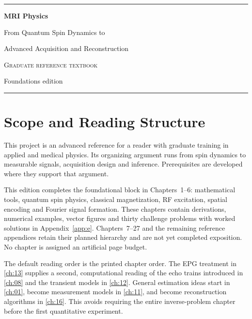 \documentclass[a4paper,10pt,twoside,openany]{book}
\begin{document}
\frontmatter
\begin{titlepage}
\thispagestyle{empty}
\vspace*{27mm}
{\noindent\color{MRIaccent}\rule{\textwidth}{1.1pt}\par}
\vspace{12mm}
{\fontsize{38}{43}\selectfont\bfseries MRI Physics\par}
\vspace{9mm}
{\Large From Quantum Spin Dynamics to\par
Advanced Acquisition and Reconstruction\par}
\vfill
{\small\scshape Graduate reference textbook\par}
\vspace{3mm}
{\small Foundations edition\par}
\vspace{10mm}
{\noindent\color{MRIaccent}\rule{\textwidth}{.4pt}\par}
\end{titlepage}
\chapter{Scope and Reading Structure}
\label{front:scope}
This project is an advanced reference for a reader with graduate training
in applied and medical physics. Its organizing argument runs from spin
dynamics to measurable signals, acquisition design and inference.
Prerequisites are developed where they support that argument.

This edition completes the foundational block in Chapters~1--6:
mathematical tools, quantum spin physics, classical magnetization,
RF excitation, spatial encoding and Fourier signal formation.
These chapters contain derivations, numerical examples, vector figures
and thirty challenge problems with worked solutions in Appendix~\ref{app:e}.
Chapters~7--27 and the remaining reference appendices retain their planned
hierarchy and are not yet completed exposition. No chapter is assigned
an artificial page budget.

The default reading order is the printed chapter order. The EPG treatment
in \cref{ch:13} supplies a second, computational reading of the echo trains
introduced in \cref{ch:08} and the transient models in \cref{ch:12}.
General estimation ideas start in \cref{ch:01}, become measurement models
in \cref{ch:11}, and become reconstruction algorithms in \cref{ch:16}.
This avoids requiring the entire inverse-problem chapter before the
first quantitative experiment.
\end{document}
